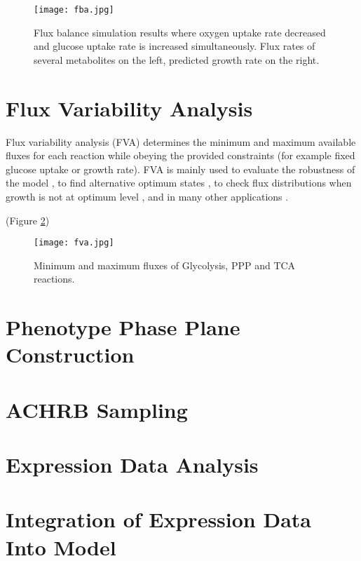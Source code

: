 \begin{figure}
\begin{center}
\texttt{[image: fba.jpg]}
\end{center}
\caption[Flux balance simulation results]{Flux balance simulation results where oxygen uptake rate decreased and glucose uptake rate is increased simultaneously. Flux rates of several metabolites on the left, predicted growth rate on the right.}
\label{fig:fba}
\end{figure}


\section{Flux Variability Analysis}
Flux variability analysis (FVA) determines the minimum and maximum available fluxes for each reaction while obeying the provided constraints (for example fixed glucose uptake or growth rate). FVA is mainly used to evaluate the robustness of the model \cite{thiele2010functional}, to find alternative optimum states \cite{mahadevan2003effects}, to check flux distributions when growth is not at optimum level \cite{reed2004genome}, and in many other applications \cite{gudmundsson2010computationally}.


(Figure \ref{fig:fva})

\begin{figure}
\begin{center}
\texttt{[image: fva.jpg]}
\end{center}
\caption[Minimum and maximum fluxes of Glycolysis, PPP and TCA reactions]{Minimum and maximum fluxes of Glycolysis, PPP and TCA reactions.}
\label{fig:fva}
\end{figure}

\section{Phenotype Phase Plane Construction}
\section{ACHRB Sampling}
\section{Expression Data Analysis}
\section{Integration of Expression Data Into Model}
